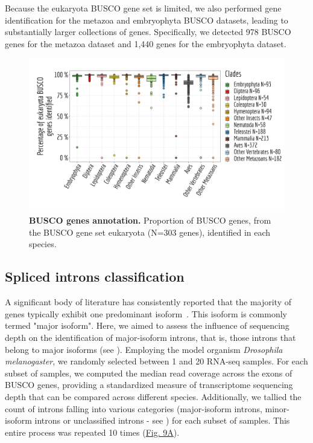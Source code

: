 Because the eukaryota \acrshort{BUSCO} gene set is limited, we also performed gene identification for the metazoa and embryophyta \acrshort{BUSCO} datasets, leading to substantially larger collections of genes. Specifically, we detected 978 \acrshort{BUSCO} genes for the metazoa dataset and 1,440 genes for the embryophyta dataset.

\begin{figure}[t]   
         \centering
        \includegraphics[width=\textwidth]{Figure8.pdf}
                                                                           
    \caption[BUSCO genes annotation]{\textbf{\acrshort{BUSCO} genes annotation.} Proportion of \acrshort{BUSCO} genes, from the \acrshort{BUSCO} gene set eukaryota (N=303 genes), identified in each species.\newline}
    \label{fig:gtdrift8}
\end{figure}

\subsection{Spliced introns classification}
A significant body of literature has consistently reported that the majority of genes typically exhibit one predominant isoform~\citep{gonzalez-porta_transcriptome_2013, tress_alternative_2017}. This isoform is commonly termed "major isoform". Here, we aimed to assess the influence of sequencing depth on the identification of major-isoform introns, that is, those introns that belong to major isoforms (see ). Employing the model organism \textit{Drosophila melanogaster}, we randomly selected between 1 and 20 RNA-seq samples. For each subset of samples, we computed the median read coverage across the exons of \acrshort{BUSCO} genes, providing a standardized measure of transcriptome sequencing depth that can be compared across different species. Additionally, we tallied the count of introns falling into various categories (major-isoform introns, minor-isoform introns or unclassified introns - see ) for each subset of samples. This entire process was repeated 10 times (\hyperref[fig:gtdrift9]{Fig. 9A}).

